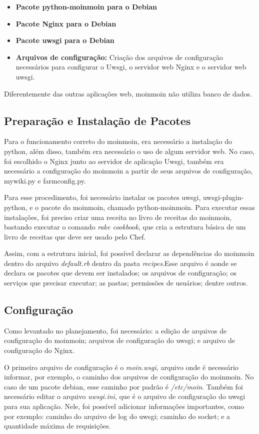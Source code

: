 \begin{itemize}
   \item \textbf{Pacote python-moinmoin para o Debian}
   \item \textbf{Pacote Nginx para o Debian}
   \item \textbf{Pacote uwsgi para o Debian}
   \item \textbf{Arquivos de configuração:} Criação dos arquivos de configuração
   necessários para configurar o Uwsgi, o servidor web Nginx e o servidor web
uwsgi.
\end{itemize}

Diferentemente das outras aplicações web, moinmoin não utiliza banco de dados.

\subsection{Preparação e Instalação de Pacotes}

Para o funcionamento correto do moinmoin, era necessário a instalação do python, além
disso, também era necessário o uso de algum servidor web. No caso, foi escolhido o Nginx
junto ao servidor de aplicação Uwsgi, também era necessário a configuração do 
moinmoin a partir de seus
arquivos de configuração, mywiki.py e farmconfig.py.

Para esse procedimento, foi necessário instalar os pacotes uwsgi,
uwsgi-plugin-python, e o pacote do moinmoin, chamado python-moinmoin.
Para executar essas instalações, foi preciso criar uma receita no livro de receitas
do moinmoin, bastando executar o comando \textit{rake cookbook}, que cria a
estrutura básica de um livro de receitas que deve ser usado pelo Chef.

Assim, com a estrutura inicial, foi possível declarar as dependências do moinmoin
dentro do arquivo \textit{default.rb} dentro da pasta \textit{recipes}.Esse arquivo 
é aonde se declara os pacotes que devem ser instalados; os arquivos de configuração;
os serviços que precisar executar; as pastas; permissões de usuários; dentre outros.

\subsection{Configuração}

Como levantado no planejamento, foi necessário: a edição de arquivos de configuração
do moinmoin; arquivos de configuração do uwsgi; e arquivo de configuração
do Nginx.

O primeiro arquivo de configuração é o \textit{moin.wsgi}, arquivo onde é necessário
informar, por exemplo, o caminho dos arquivos de configuração do moinmoin. No caso
de um pacote debian, esse caminho por padrão é  \textit{/etc/moin}. Também foi necessário 
editar o arquivo \textit{uwsgi.ini}, que é o arquivo de configuração
do uwsgi para sua aplicação. Nele, foi possível adicionar informações importantes, como
por exemplo: caminho do arquivo de log do uwsgi; caminho do socket;
e a quantidade máxima de requisições.

